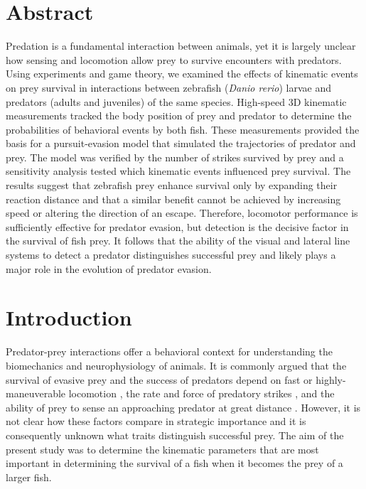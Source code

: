 \documentclass[]{rsos}%
\begin{document}
\section*{Abstract}
Predation is a fundamental interaction between animals, yet it is largely unclear how sensing and locomotion allow prey to survive encounters with predators.
Using experiments and game theory, we examined the effects of kinematic events on prey survival in interactions between zebrafish (\textit{Danio rerio}) larvae and predators (adults and juveniles) of the same species.
High-speed 3D kinematic measurements tracked the body position of prey and predator to determine the probabilities of behavioral events by both fish.
These measurements provided the basis for a pursuit-evasion model that simulated the trajectories of predator and prey. 
The model was verified by the number of strikes survived by prey and a sensitivity analysis tested which kinematic events influenced prey survival.
The results suggest that zebrafish prey enhance survival only by expanding their reaction distance and that a similar benefit cannot be achieved by increasing speed or altering the direction of an escape.
Therefore, locomotor performance is sufficiently effective for predator evasion, but detection is the decisive factor in the survival of fish prey.
It follows that the ability of the visual and lateral line systems to detect a predator distinguishes successful prey and likely plays a major role in the evolution of predator evasion.

\section{Introduction}

Predator-prey interactions offer a behavioral context for understanding the biomechanics and neurophysiology of animals.
It is commonly argued that the survival of evasive prey and the success of predators depend on fast or highly-maneuverable locomotion \cite{Alexander:BbR35qCj, Wilson:2013fda, Walker:2005vn, Domenici:2011tv, Howland:1974ud}, the rate and force of predatory strikes \cite{deVries:2012tc, Holzman:2009uu}, and the ability of prey to sense an approaching predator at great distance \cite{Dill:1972wh, Gabbiani:1999wz}.
However, it is not clear how these factors compare in strategic importance and it is consequently unknown what traits distinguish successful prey. 
The aim of the present study was to determine the kinematic parameters that are most important in determining the survival of a fish when it becomes the prey of a larger fish.
\end{document}
